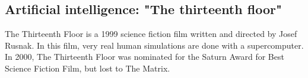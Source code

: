  
 
 
 
  
  
     
        \subsection*{Artificial intelligence: "The thirteenth floor"} 
 The Thirteenth Floor is a 1999 science fiction film written and directed by Josef Rusnak. 
 In this film, very real human simulations are done with a supercomputer. 
 In 2000, The Thirteenth Floor was nominated for the Saturn Award for Best Science Fiction Film, but lost to The Matrix.
 
